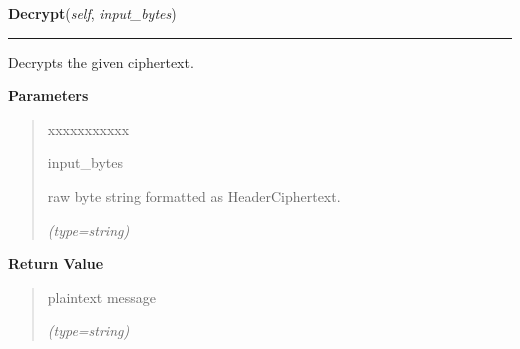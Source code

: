     \label{keyczar:keys:RsaPrivateKey:Decrypt}

    \vspace{0.5ex}

\hspace{.8\funcindent}\begin{boxedminipage}{\funcwidth}

    \raggedright \textbf{Decrypt}(\textit{self}, \textit{input\_bytes})

    \vspace{-1.5ex}

    \rule{\textwidth}{0.5\fboxrule}
\setlength{\parskip}{2ex}
    Decrypts the given ciphertext.

\setlength{\parskip}{1ex}
      \textbf{Parameters}
      \vspace{-1ex}

      \begin{quote}
        \begin{Ventry}{xxxxxxxxxxx}

          \item[input\_bytes]

          raw byte string formatted as Header{\textbar}Ciphertext.

            {\it (type=string)}

        \end{Ventry}

      \end{quote}

      \textbf{Return Value}
    \vspace{-1ex}

      \begin{quote}
      plaintext message

      {\it (type=string)}

      \end{quote}

    \end{boxedminipage}

    \label{keyczar:keys:RsaPrivateKey:Sign}

    \vspace{0.5ex}

